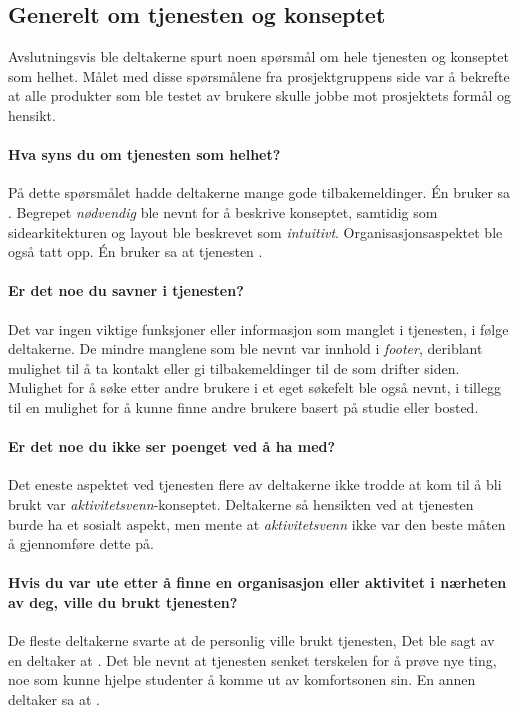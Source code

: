 \subsection{Generelt om tjenesten og konseptet}

Avslutningsvis ble deltakerne spurt noen spørsmål om hele tjenesten og konseptet som helhet. Målet med disse spørsmålene fra prosjektgruppens side var å bekrefte at alle produkter som ble testet av brukere skulle jobbe mot prosjektets formål og hensikt.

\paragraph{Hva syns du om tjenesten som helhet?}
På dette spørsmålet hadde deltakerne mange gode tilbakemeldinger. Én bruker sa . Begrepet {\em nødvendig} ble nevnt for å beskrive konseptet, samtidig som sidearkitekturen og layout ble beskrevet som {\em intuitivt}. Organisasjonsaspektet ble også tatt opp. Én bruker sa at tjenesten .

\paragraph{Er det noe du savner i tjenesten?}
Det var ingen viktige funksjoner eller informasjon som manglet i tjenesten, i følge deltakerne. De mindre manglene som ble nevnt var innhold i {\em footer}, deriblant mulighet til å ta kontakt eller gi tilbakemeldinger til de som drifter siden. Mulighet for å søke etter andre brukere i et eget søkefelt ble også nevnt, i tillegg til en mulighet for å kunne finne andre brukere basert på studie eller bosted.

\paragraph{Er det noe du ikke ser poenget ved å ha med?}
Det eneste aspektet ved tjenesten flere av deltakerne ikke trodde at kom til å bli brukt var {\em aktivitetsvenn}-konseptet. Deltakerne så hensikten ved at tjenesten burde ha et sosialt aspekt, men mente at {\em aktivitetsvenn} ikke var den beste måten å gjennomføre dette på.

\paragraph{Hvis du var ute etter å finne en organisasjon eller aktivitet i nærheten av deg, ville du brukt tjenesten?}
De fleste deltakerne svarte at de personlig ville brukt tjenesten, Det ble sagt av en deltaker at . Det ble nevnt at tjenesten senket terskelen for å prøve nye ting, noe som kunne hjelpe studenter å komme ut av komfortsonen sin. En annen deltaker sa at .

